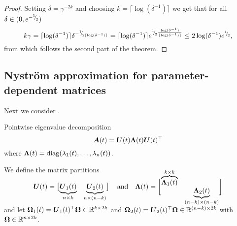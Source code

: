 \documentclass[12pt]{article}
\begin{document}
\begin{proof}
    Setting $\delta = \gamma^{-2 k}$ and choosing $k = \lceil \log(\delta^{-1}) \rceil$ we get that for all $\delta \in (0, e^{-{}^{1}{\mskip -5mu/\mskip -3mu}_{2}})$
    \begin{equation}
        k \gamma = \lceil \log(\delta^{-1}) \rceil \delta^{-{}^{1}{\mskip -5mu/\mskip -3mu}_{2\lceil \log(\delta^{-1}) \rceil}}
        = \lceil \log(\delta^{-1}) \rceil e^{{}^{1}{\mskip -5mu/\mskip -3mu}_{2}\frac{\log(\delta^{-1})}{\lceil \log(\delta^{-1}) \rceil}}
        \leq 2 \log(\delta^{-1}) e^{{}^{1}{\mskip -5mu/\mskip -3mu}_{2}},
    \end{equation}
    from which follows the second part of the theorem.
\end{proof}


\subsection{Nyström approximation for parameter-dependent matrices}
\label{subsec:nystrom}

Next we consider . 

Pointwise eigenvalue decomposition
\begin{equation}
    \boldsymbol{A}(t) 
    = \boldsymbol{U}(t) \boldsymbol{\Lambda}(t) \boldsymbol{U}(t)^{\top} 
\end{equation}
where $\boldsymbol{\Lambda}(t) = \operatorname{diag}(\lambda_1(t), \dots, \lambda_n(t))$.

We define the matrix partitions
\begin{equation}
    \rule[\dimexpr-2ex-\ht\strutbox]{0pt}{\dimexpr2ex+2ex+\baselineskip}
    \mtx{U}(t) = \begin{bmatrix}
        \smash{\underbrace{\mtx{U}_1(t)}_{n \times k}} & \smash{\underbrace{\mtx{U}_2(t)}_{n \times (n-k)}}
    \end{bmatrix}
    \quad \text{and} \quad
    \mtx{\Lambda}(t) =
    \begin{bmatrix}
        \smash{\overbrace{\mtx{\Lambda}_1(t)}^{k \times k}} & \\ & \smash{\underbrace{\mtx{\Lambda}_2(t)}_{(n-k) \times (n-k)}}
    \end{bmatrix}
\end{equation}
and let $\boldsymbol{\Omega}_1(t) = \boldsymbol{U}_1(t)^{\top} \boldsymbol{\Omega} \in \mathbb{R}^{k \times 2k}$ and $\boldsymbol{\Omega}_2(t) = \boldsymbol{U}_2(t)^{\top} \boldsymbol{\Omega} \in \mathbb{R}^{(n - k) \times 2k}$ with $\boldsymbol{\Omega} \in \mathbb{R}^{n \times 2k}$.
\end{document}
